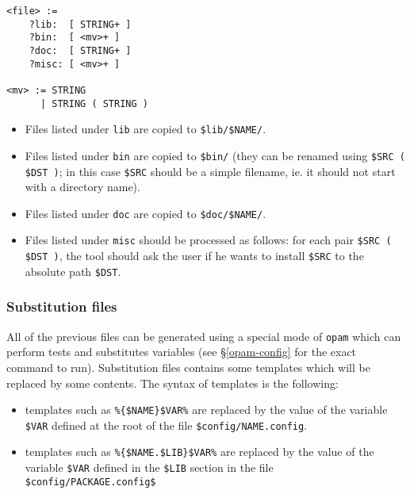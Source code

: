 \documentclass[a4paper,11pt]{article}
\begin{document}
{\small
\begin{Verbatim}[frame=single]
<file> :=
    ?lib:  [ STRING+ ]
    ?bin:  [ <mv>+ ]
    ?doc:  [ STRING+ ]
    ?misc: [ <mv>+ ]

<mv> := STRING
      | STRING ( STRING )
\end{Verbatim}
}

\begin{itemize}
\item Files listed under {\tt lib} are copied to \verb+$lib/$NAME/+.
\item Files listed under {\tt bin} are copied to \verb+$bin/+ (they
  can be renamed using \verb+$SRC ( $DST )+; in this case \verb+$SRC+
  should be a simple filename, ie. it should not start with a
  directory name).
\item Files listed under {\tt doc} are copied to \verb+$doc/$NAME/+.
\item Files listed under {\tt misc} should be processed as follows:
  for each pair \verb+$SRC ( $DST )+, the tool should ask the user if
  he wants to install \verb+$SRC+ to the absolute path \verb+$DST+.
\end{itemize}

\subsubsection{Substitution files}
\label{subst}

All of the previous files can be generated using a special mode of
{\tt opam} which can perform tests and substitutes variables (see
\S\ref{opam-config} for the exact command to run). Substitution files
contains some templates which will be replaced by some contents. The
syntax of templates is the following:

\begin{itemize}

\item templates such as \verb+%{$NAME}$VAR%+ are replaced by the value
  of the variable \verb+$VAR+ defined at the root of the file
  \verb+$config/NAME.config+.

\item templates such as \verb+%{$NAME.$LIB}$VAR%+ are replaced by the
  value of the variable \verb+$VAR+ defined in the \verb+$LIB+ section
  in the file \verb+$config/PACKAGE.config$+


\end{itemize}
\end{document}

